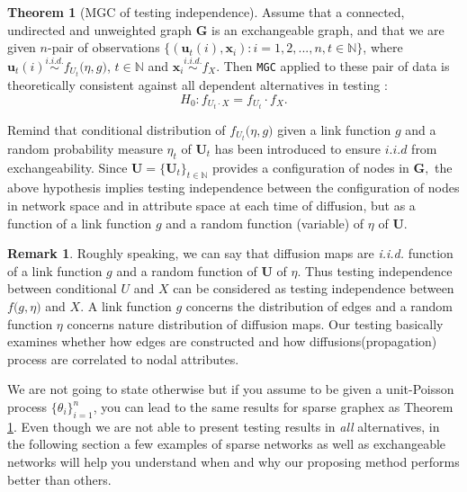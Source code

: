 \documentclass[12pt]{article}
\theoremstyle{definition}
\newtheorem{theorem}{Theorem}[section]
\newtheorem{remark}{Remark}
\begin{document}
\begin{theorem}[MGC of testing independence]
 \label{theorem1}
Assume that a connected, undirected and unweighted graph $\mathbf{G}$ is an exchangeable graph, and that we are given $n$-pair of observations $\{ ( \mathbf{u}_{t}(i), \mathbf{x}_{i}): i = 1,2,... , n  , t \in \mathbb{N} \}$, where $\textbf{u}_{t}(i) \overset{i.i.d.}{\sim} f_{U_t} \big(  \eta, g \big)$, $t \in \mathbb{N}$ and $\mathbf{x}_{i} \overset{i.i.d.}{\sim} f_{X}$. Then \texttt{MGC} applied to these pair of data is theoretically consistent against all dependent alternatives in testing :
\begin{equation}
H_{0} : f_{U_t \cdot X} = f_{U_t} \cdot f_{X}.
\end{equation}
\end{theorem}
Remind that conditional distribution of $f_{U_t} \big( \eta, g \big)$ given a link function $g$ and a random probability measure $\eta_{t}$ of $\mathbf{U}_t$ has been introduced to ensure $\textit{i.i.d}$ from exchangeability. Since $\boldsymbol{U}  = \{ \boldsymbol{U}_{t} \}_{t \in \mathbb{N}}$ provides a configuration of nodes in $\boldsymbol{G},$ the above hypothesis implies testing independence between the configuration of nodes in network space and in attribute space at each time of diffusion, but as a function of a link function $g$ and a random function (variable) of $\eta$ of $\mathbf{U}$.
	
\begin{remark}
	Roughly speaking, we can say that diffusion maps are \textit{i.i.d.} function of a link function $g$ and a random function of $\mathbf{U}$ of $\eta$. Thus testing independence between conditional $U$ and $X$ can be considered as testing independence between $f \big( g, \eta \big)$ and $X$. A link function $g$ concerns the distribution of edges and a random function $\eta$ concerns nature distribution of diffusion maps. Our testing basically examines whether how edges are constructed and how diffusions(propagation) process are correlated to nodal attributes.  
\end{remark}

We are not going to state otherwise but if you assume to be given a unit-Poisson process $\{ \theta_{i} \}_{i=1}^{n}$, you can lead to the same results for sparse graphex as Theorem \ref{theorem1}. Even though we are not able to present testing results in \textit{all} alternatives, in the following section a few examples of sparse networks as well as exchangeable networks will help you understand when and why our proposing method performs better than others. 
\end{document}
